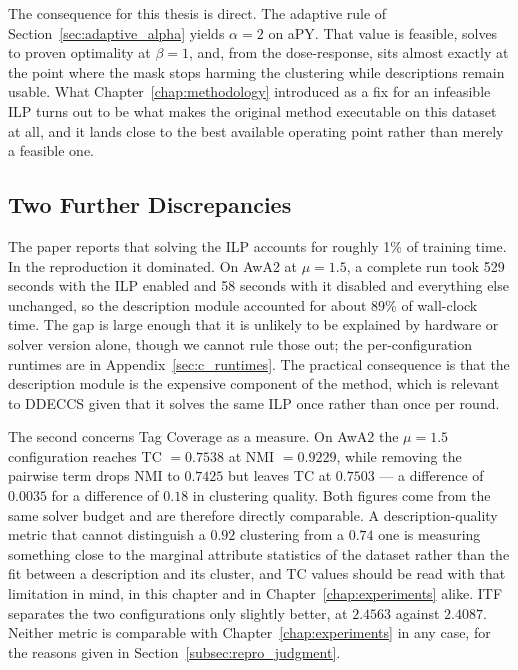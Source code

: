 The consequence for this thesis is direct. The adaptive rule of Section~\ref{sec:adaptive_alpha} yields $\alpha = 2$ on aPY. That value is feasible, solves to proven optimality at $\beta = 1$, and, from the dose-response, sits almost exactly at the point where the mask stops harming the clustering while descriptions remain usable. What Chapter~\ref{chap:methodology} introduced as a fix for an infeasible ILP turns out to be what makes the original method executable on this dataset at all, and it lands close to the best available operating point rather than merely a feasible one.

\subsection{Two Further Discrepancies}
\label{subsec:repro_discrepancies}

The paper reports that solving the ILP accounts for roughly 1\% of training time. In the reproduction it dominated. On AwA2 at $\mu = 1.5$, a complete run took 529 seconds with the ILP enabled and 58 seconds with it disabled and everything else unchanged, so the description module accounted for about 89\% of wall-clock time. The gap is large enough that it is unlikely to be explained by hardware or solver version alone, though we cannot rule those out; the per-configuration runtimes are in Appendix~\ref{sec:c_runtimes}. The practical consequence is that the description module is the expensive component of the method, which is relevant to DDECCS given that it solves the same ILP once rather than once per round.

The second concerns Tag Coverage as a measure. On AwA2 the $\mu = 1.5$ configuration reaches TC $= 0.7538$ at NMI $= 0.9229$, while removing the pairwise term drops NMI to $0.7425$ but leaves TC at $0.7503$ --- a difference of $0.0035$ for a difference of $0.18$ in clustering quality. Both figures come from the same solver budget and are therefore directly comparable. A description-quality metric that cannot distinguish a $0.92$ clustering from a $0.74$ one is measuring something close to the marginal attribute statistics of the dataset rather than the fit between a description and its cluster, and TC values should be read with that limitation in mind, in this chapter and in Chapter~\ref{chap:experiments} alike. ITF separates the two configurations only slightly better, at $2.4563$ against $2.4087$. Neither metric is comparable with Chapter~\ref{chap:experiments} in any case, for the reasons given in Section~\ref{subsec:repro_judgment}.

